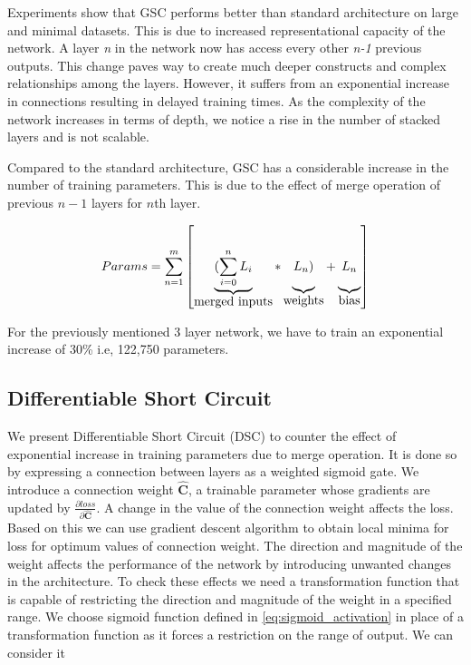 \usepackage{}\documentclass{article}
\let\oldhat\hat
\renewcommand{\hat}[1]{\oldhat{\mathbf{#1}}}
\begin{document}
Experiments show that GSC performs better than standard architecture on large and minimal datasets. This is due to increased representational capacity of the network. A layer \emph{n} in the network now has access every other \emph{n-1} previous outputs. This change paves way to create much deeper constructs and complex relationships among the layers. However, it suffers from an exponential increase in connections resulting in delayed training times. As the complexity of the network increases in terms of depth, we notice a rise in the number of stacked layers and is not scalable.

Compared to the standard architecture, GSC has a considerable increase in the number of training parameters.  This is due to the effect of merge operation of previous $n-1$ layers for $n$th layer.

\begin{equation}
\label{eq:gsc_params}
Params= \sum_{n=1}^{m}\left[
\underbrace{(\sum_{i=0}^{n}L_{i}\rule[-12pt]{0pt}{5pt}}_{\mbox{merged inputs}}
*\underbrace{L_{n})\rule[-12pt]{0pt}{5pt}}_{\mbox{weights}}
+\underbrace{L_{n}\rule[-12pt]{0pt}{5pt}}_{\mbox{bias}}\right]
\end{equation}

For the previously mentioned 3 layer network, we have to train an exponential increase of 30\% i.e, 122,750 parameters.

\subsection{Differentiable Short Circuit}
We present Differentiable Short Circuit (DSC) to counter the effect of exponential increase in training parameters due to merge operation. It is done so by expressing a connection between layers as a weighted sigmoid gate. We introduce a connection weight $\hat{C}$, a trainable parameter whose gradients are updated by $\frac{\partial loss}{\partial \hat{C}}$. A change in the value of the connection weight affects the loss. Based on this we can use gradient descent algorithm to obtain local minima for loss for optimum values of connection weight. The direction and magnitude of the weight affects the performance of the network by introducing unwanted changes in the architecture. To check these effects we need a transformation function that is capable of restricting the direction and magnitude of the weight in a specified range. We choose sigmoid function defined in \ref{eq:sigmoid_activation} in place of a transformation function as it forces a restriction on the range of output. We can consider it
\end{document}
